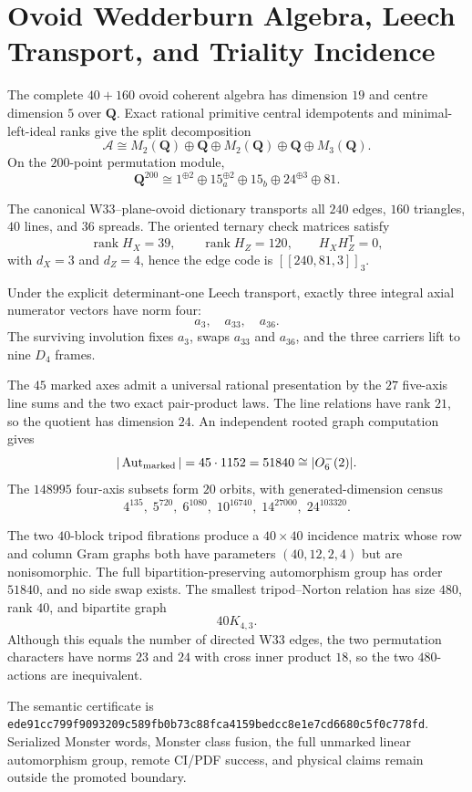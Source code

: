 \section{Ovoid Wedderburn Algebra, Leech Transport, and Triality Incidence}
\label{sec:bt3837-3854}

The complete $40+160$ ovoid coherent algebra has dimension $19$ and centre dimension $5$ over $\mathbf Q$.  Exact rational primitive central idempotents and minimal-left-ideal ranks give the split decomposition
\[
\mathcal A\cong M_2(\mathbf Q)\oplus\mathbf Q\oplus M_2(\mathbf Q)\oplus\mathbf Q\oplus M_3(\mathbf Q).
\]
On the $200$-point permutation module,
\[
\mathbf Q^{200}\cong 1^{\oplus2}\oplus15_a^{\oplus2}\oplus15_b\oplus24^{\oplus3}\oplus81.
\]

The canonical W33--plane-ovoid dictionary transports all $240$ edges, $160$ triangles, $40$ lines, and $36$ spreads.  The oriented ternary check matrices satisfy
\[
\operatorname{rank}H_X=39,\qquad \operatorname{rank}H_Z=120,\qquad H_XH_Z^{\mathsf T}=0,
\]
with $d_X=3$ and $d_Z=4$, hence the edge code is $[[240,81,3]]_3$.

Under the explicit determinant-one Leech transport, exactly three integral axial numerator vectors have norm four:
\[
a_3,\quad a_{33},\quad a_{36}.
\]
The surviving involution fixes $a_3$, swaps $a_{33}$ and $a_{36}$, and the three carriers lift to nine $D_4$ frames.

The $45$ marked axes admit a universal rational presentation by the $27$ five-axis line sums and the two exact pair-product laws.  The line relations have rank $21$, so the quotient has dimension $24$.  An independent rooted graph computation gives
\[
|\operatorname{Aut}_{\rm marked}|=45\cdot1152=51840\cong |O_6^-(2)|.
\]
The $148995$ four-axis subsets form $20$ orbits, with generated-dimension census
\[
4^{135},\;5^{720},\;6^{1080},\;10^{16740},\;14^{27000},\;24^{103320}.
\]

The two $40$-block tripod fibrations produce a $40\times40$ incidence matrix whose row and column Gram graphs both have parameters $(40,12,2,4)$ but are nonisomorphic.  The full bipartition-preserving automorphism group has order $51840$, and no side swap exists.  The smallest tripod--Norton relation has size $480$, rank $40$, and bipartite graph
\[
40K_{4,3}.
\]
Although this equals the number of directed W33 edges, the two permutation characters have norms $23$ and $24$ with cross inner product $18$, so the two $480$-actions are inequivalent.

The semantic certificate is
\texttt{ede91cc799f9093209c589fb0b73c88fca4159bedcc8e1e7cd6680c5f0c778fd}.
Serialized Monster words, Monster class fusion, the full unmarked linear automorphism group, remote CI/PDF success, and physical claims remain outside the promoted boundary.

